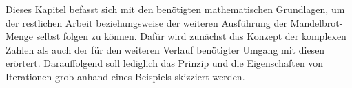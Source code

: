 
Dieses Kapitel befasst sich mit den ben\"otigten mathematischen Grundlagen, um
der restlichen Arbeit beziehungsweise der weiteren Ausführung der Mandelbrot-Menge
selbst folgen zu k\"onnen.
Daf\"ur wird zun\"achst das Konzept der komplexen Zahlen als auch der f\"ur den weiteren
Verlauf ben\"otigter Umgang mit diesen er\"ortert.
Darauffolgend soll lediglich das Prinzip und die Eigenschaften von Iterationen grob
anhand eines Beispiels skizziert werden.


